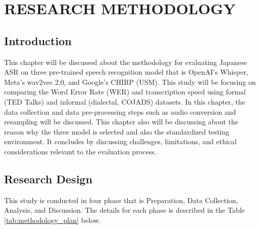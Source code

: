 \chapter{RESEARCH METHODOLOGY}

\section{Introduction}
This chapter will be discussed about the methodology for evaluating Japanese ASR on three pre-trained speech recognition model that is OpenAI’s Whisper, Meta’s wav2vec 2.0, and Google’s CHIRP (USM). This study will be focusing on comparing the Word Error Rate (WER) and transcription speed using formal (TED Talks) and informal (dialectal, COJADS) datasets. In this chapter, the data collection and data pre-processing steps such as audio conversion and resampling will be discussed. This chapter also will be discussing about the reason why the three model is selected and also the standardized testing environment. It concludes by discussing challenges, limitations, and ethical considerations relevant to the evaluation process.

\section{Research Design}
This study is conducted in four phase that is Preparation, Data Collection, Analysis, and Discussion. The details for each phase is described in the Table \ref{tab:methodology_plan} below.

